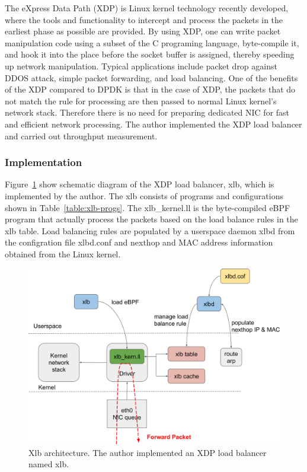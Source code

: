 The eXpress Data Path (XDP) \cite{hoiland2018express} is Linux kernel technology recently developed, where the tools and functionality to intercept and process the packets in the earliest phase as possible are provided.
By using XDP, one can write packet manipulation code using a subset of the C programing language, byte-compile it, and hook it into the place before the socket buffer is assigned, thereby speeding up network manipulation.
Typical applications include packet drop against DDOS attack, simple packet forwarding, and load balancing.
One of the benefits of the XDP compared to DPDK is that in the case of XDP, the packets that do not match the rule for processing are then passed to normal Linux kernel's network stack.
Therefore there is no need for preparing dedicated NIC for fast and efficient network processing.
The author implemented the XDP load balancer and carried out throughput measurement.

\subsubsection{Implementation}

Figure~\ref{fig:xlb-schem} show schematic diagram of the XDP load balancer, xlb, which is implemented by the author.
The xlb consists of programs and configurations shown in Table~\ref{table:xlb-progs}.
The xlb\_kernel.ll is the byte-compiled eBPF program that actually process the packets based on the load balance rules in the xlb table.
Load balancing rules are populated by a userspace daemon xlbd from the configration file xlbd.conf and nexthop and MAC address information obtained from the Linux kernel.

\begin{figure}[h]
  \centering
  \includegraphics[width=0.9\columnwidth]{Figs/xlb-schem}

  \par\bigskip
  \centering
  \begin{minipage}{0.9\columnwidth}
    \caption[Xlb architecture]{
      Xlb architecture.
      The author implemented an XDP load balancer named xlb.
    }
    \label{fig:xlb-schem}
  \end{minipage}
\end{figure}

